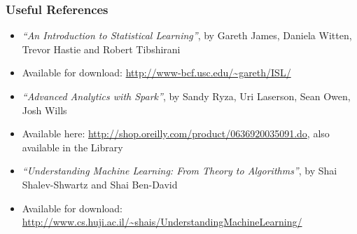 \begin{frame}\frametitle{Useful References}
\begin{itemize}
	\item \emph{``An Introduction to Statistical Learning''}, by Gareth James, Daniela Witten, Trevor Hastie and Robert Tibshirani
	\item[] Available for download: \url{http://www-bcf.usc.edu/\~gareth/ISL/}

	\item \emph{``Advanced Analytics with Spark''}, by Sandy Ryza, Uri Laserson, Sean Owen, Josh Wills
	\item[] Available here: \url{http://shop.oreilly.com/product/0636920035091.do}, also available in the Library

	\item \emph{``Understanding Machine Learning: From Theory to Algorithms''}, by Shai Shalev-Shwartz and Shai Ben-David
	\item[] Available for download: \url{http://www.cs.huji.ac.il/~shais/UnderstandingMachineLearning/}
\end{itemize}
\end{frame}
